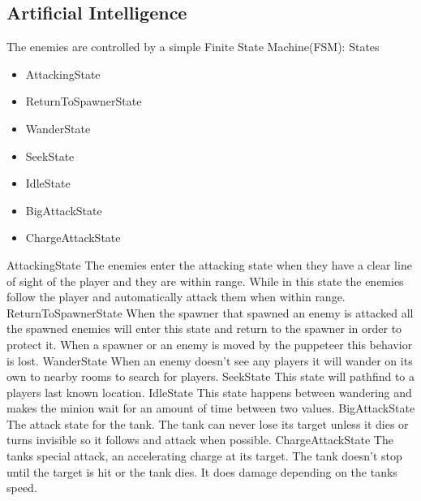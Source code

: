 \documentclass[11pt]{article}
\begin{document}
\newpage

\subsection{Artificial Intelligence}
The enemies are controlled by a simple Finite State Machine(FSM):
\newline
\newline States
\begin{itemize}
	\item AttackingState
	\item ReturnToSpawnerState
	\item WanderState
	\item SeekState
	\item IdleState
	\item BigAttackState
	\item ChargeAttackState
\end{itemize}
AttackingState
\newline
The enemies enter the attacking state when they have a clear line of sight of the player and they are within range. While in this state the enemies follow the player and automatically attack them when within range.
\newline
\newline ReturnToSpawnerState
\newline
When the spawner that spawned an enemy is attacked all the spawned enemies will enter this state and return to the spawner in order to protect it. When a spawner or an enemy is moved by the puppeteer this behavior is lost.
\newline
\newline WanderState
\newline
When an enemy doesn’t see any players it will wander on its own to nearby rooms to search for players.
\newline
\newline SeekState
\newline
This state will pathfind to a players last known location.
\newline
\newline IdleState
\newline
This state happens between wandering and makes the minion wait for an amount of time between two values.
\newline
\newline BigAttackState
\newline
The attack state for the tank. The tank can never lose its target unless it dies or turns invisible so it follows and attack when possible.
\newline
\newline ChargeAttackState
\newline
The tanks special attack, an accelerating charge at its target. The tank doesn't stop until the target is hit or the tank dies. It does damage depending on the tanks speed.
\end{document}
